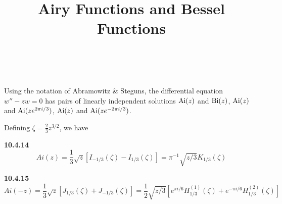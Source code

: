 \documentclass[12pt]{article}
\title{Airy Functions and Bessel Functions}
\author{~~~}
\newcommand{\Ai}{{\rm Ai}}
\newcommand{\Bi}{{\rm Bi}}
\begin{document}
\maketitle

\noindent Using the notation of Abramowitz \& Steguns,
the differential equation $w''-zw=0$ has pairs
of linearly independent solutions
$\Ai(z)$ and $\Bi(z)$,
$\Ai(z)$ and $\Ai(ze^{2\pi i/3})$,
$\Ai(z)$ and $\Ai(ze^{-2\pi i/3})$.

\medskip

\noindent Defining $\zeta = \frac23 z^{3/2}$, we have

\bigskip

{\bf 10.4.14}
$$ Ai(z) =
	\frac13\sqrt{z}\left[
	I_{-1/3}(\zeta)
	-I_{1/3}(\zeta) \right]
	=
	\pi^{-1}\sqrt{z/3}K_{1/3}(\zeta)
$$

{\bf 10.4.15}
$$ Ai(-z) =
	\frac13\sqrt{z}
	\left[
	J_{1/3}(\zeta) +
	J_{-1/3}(\zeta) \right]
	=
	\frac12 \sqrt{z/3} \left[
	e^{\pi i/6} H_{1/3}^{(1)}(\zeta)
	+ e^{-\pi i/6}H_{1/3}^{(2)}(\zeta)
	\right]
$$
\end{document}
